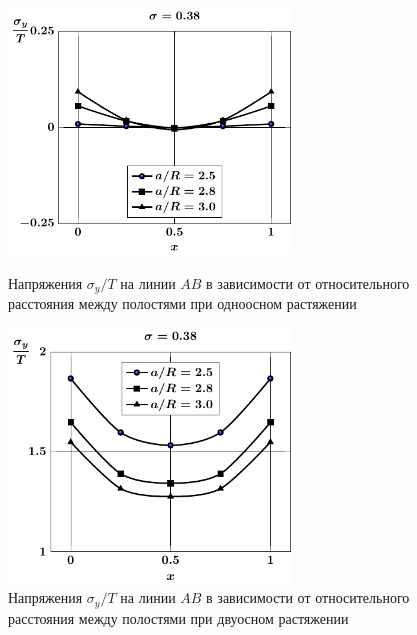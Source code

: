 \begin{figure}[th!]
\centering\footnotesize
\parbox[b]{7.5cm}{\centering\includegraphics[width=7.5cm]{spheres-cav9-a-t1-sig_y.pdf}
\caption{Напряжения $\sigma_y/T$ на линии $AB$ в зависимости от относительного расстояния между полостями при одноосном растяжении
\label{f:8:33}}}\hfil\hfil
\parbox[b]{7.5cm}{\centering\includegraphics[width=7.5cm]{spheres-cav9-a-t2-sig_y.pdf}
\caption{Напряжения $\sigma_y/T$ на линии $AB$ в зависимости от относительного расстояния между полостями при двуосном растяжении
\label{f:8:34}}}
\end{figure}

